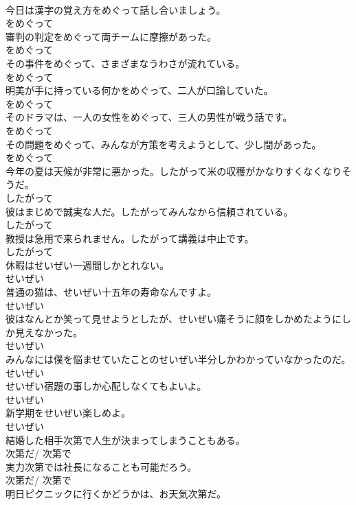 \documentclass[8pt]{extreport}
\begin{document}
\begin{CJK}{UTF8}{min}
\\	今日は漢字の覚え方をめぐって話し合いましょう。	
\\	をめぐって
\\	審判の判定をめぐって両チームに摩擦があった。	
\\	をめぐって
\\	その事件をめぐって、さまざまなうわさが流れている。	
\\	をめぐって
\\	明美が手に持っている何かをめぐって、二人が口論していた。	
\\	をめぐって
\\	そのドラマは、一人の女性をめぐって、三人の男性が戦う話です。	
\\	をめぐって
\\	その問題をめぐって、みんなが方策を考えようとして、少し間があった。	
\\	をめぐって
\\	今年の夏は天候が非常に悪かった。したがって米の収穫がかなりすくなくなりそうだ。	
\\	したがって
\\	彼はまじめで誠実な人だ。したがってみんなから信頼されている。	
\\	したがって
\\	教授は急用で来られません。したがって講義は中止です。	
\\	したがって
\\	休暇はせいぜい一週間しかとれない。	
\\	せいぜい
\\	普通の猫は、せいぜい十五年の寿命なんですよ。	
\\	せいぜい
\\	彼はなんとか笑って見せようとしたが、せいぜい痛そうに顔をしかめたようにしか見えなかった。	
\\	せいぜい
\\	みんなには僕を悩ませていたことのせいぜい半分しかわかっていなかったのだ。	
\\	せいぜい
\\	せいぜい宿題の事しか心配しなくてもよいよ。	
\\	せいぜい
\\	新学期をせいぜい楽しめよ。	
\\	せいぜい
\\	結婚した相手次第で人生が決まってしまうこともある。	
\\	次第だ/ 次第で
\\	実力次第では社長になることも可能だろう。	
\\	次第だ/ 次第で
\\	明日ピクニックに行くかどうかは、お天気次第だ。	

\end{CJK}
\end{document}
